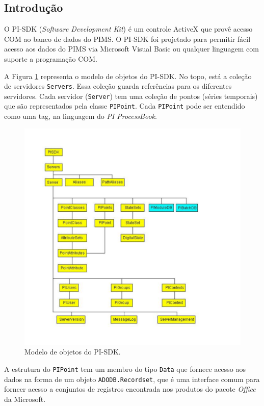 \begin{multicols}{2}


\pagestyle{plain}
\setcounter{page}{1}
\section{Introdução}

	O PI-SDK (\emph{Software Development Kit}) é um controle ActiveX que provê acesso COM ao banco de dados do PIMS. O PI-SDK foi projetado para permitir fácil acesso aos dados do PIMS via Microsoft Visual Basic ou qualquer linguagem com suporte a programação COM\cite{pihelp}.
	
	A Figura \ref{fig:model} representa o modelo de objetos do PI-SDK. No topo, está a coleção de servidores \texttt{Servers}. Essa coleção guarda referências para os diferentes servidores. Cada servidor (\texttt{Server}) tem uma coleção de pontos (séries temporais) que são representados pela classe \texttt{PIPoint}. Cada \texttt{PIPoint} pode ser entendido como uma tag, na linguagem do \emph{PI ProcessBook}.
	\begin{figure}[H]
		\centering
		\includegraphics[scale=0.55, bb=0 0 432 432, trim=0in 0in 0in 0in]{figures/model.pdf} %
		\caption{Modelo de objetos do PI-SDK\cite{pihelp}.}
		\label{fig:model}
	\end{figure}
	A estrutura do \texttt{PIPoint} tem um membro do tipo \texttt{Data} que fornece acesso aos dados na forma de um objeto \texttt{ADODB.Recordset}\cite{wiki:adors}, que é uma interface comum para forncer acesso a conjuntos de registros encontrada nos produtos do pacote \emph{Office} da Microsoft.

\end{multicols}
